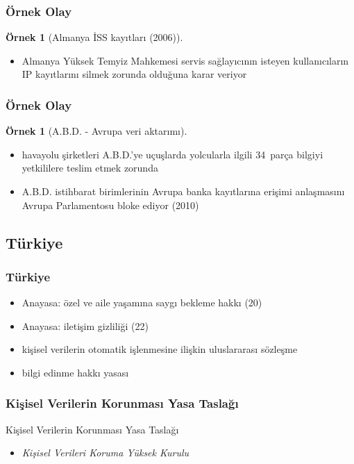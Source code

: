 \documentclass[dvipsnames]{beamer}
\theoremstyle{definition}
\theoremstyle{example}
\newtheorem{ornek}[theorem]{Örnek}
\theoremstyle{plain}
\begin{document}
\begin{frame}
  \frametitle{Örnek Olay}

  \begin{ornek}[Almanya İSS kayıtları (2006)]
    \begin{itemize}
      \item Almanya Yüksek Temyiz Mahkemesi servis sağlayıcının
        isteyen kullanıcıların IP kayıtlarını silmek zorunda
        olduğuna karar veriyor
    \end{itemize}
  \end{ornek}
\end{frame}

\begin{frame}
  \frametitle{Örnek Olay}

  \begin{ornek}[A.B.D. - Avrupa veri aktarımı]
    \begin{itemize}
      \item havayolu şirketleri A.B.D.'ye uçuşlarda yolcularla ilgili 34~parça
        bilgiyi yetkililere teslim etmek zorunda
      \item A.B.D. istihbarat birimlerinin Avrupa banka kayıtlarına erişimi
        anlaşmasını Avrupa Parlamentosu bloke ediyor (2010)
    \end{itemize}
  \end{ornek}
\end{frame}

\subsection{Türkiye}

\begin{frame}
  \frametitle{Türkiye}

  \begin{itemize}
    \item Anayasa: özel ve aile yaşamına saygı bekleme hakkı (20)
    \item Anayasa: iletişim gizliliği (22)
    \item kişisel verilerin otomatik işlenmesine ilişkin uluslararası sözleşme
    \item bilgi edinme hakkı yasası
  \end{itemize}
\end{frame}

\begin{frame}
  \frametitle{Kişisel Verilerin Korunması Yasa Taslağı}

  \begin{block}{Kişisel Verilerin Korunması Yasa Taslağı}
    \begin{itemize}
      \item \emph{Kişisel Verileri Koruma Yüksek Kurulu}
    \end{itemize}
  \end{block}
\end{frame}
\end{document}
